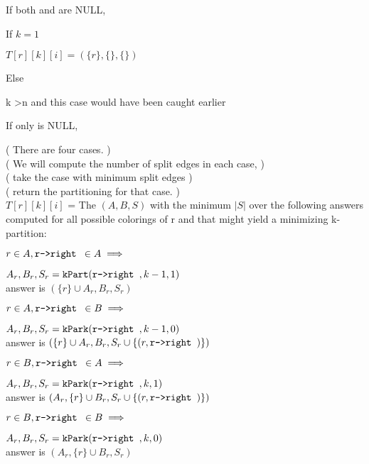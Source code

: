 \documentclass[11pt]{article}
\begin{document}
\begin{indentmore}
    If both \rleft and \rright are NULL,
        \begin{indentmore}
        If $k=1$
            \begin{indentmore}
            $T[r][k][i] = (\{r\}, \{\}, \{\})$
           \end{indentmore}
        Else
            \begin{indentmore}
            k \textgreater n and this case would have been caught earlier
           \end{indentmore}
       \end{indentmore}
    If only \rleft is NULL,
        \begin{indentmore}
        ( There are four cases. )\\
        ( We will compute the number of split edges in each case, )\\
        ( take the case with minimum split edges )\\
        ( return the partitioning for that case. )\\
        $T[r][k][i]$ = The $(A,B,S)$ with the minimum $|S|$ over the following answers computed for all possible colorings of r and \rright that might yield a minimizing k-partition:
          \begin{indentmore}
          $r \in A, \texttt{r->right } \in A \implies $
            \begin{indentmore}
            $A_r, B_r, S_r = \mathtt{kPart}(\texttt{r->right },k-1,1)$\\
            answer is $(\{r\} \cup A_r, B_r, S_r)$
            \end{indentmore}
          $r \in A, \texttt{r->right } \in B \implies $
            \begin{indentmore}
            $A_r, B_r, S_r = \mathtt{kPark}(\texttt{r->right },k-1,0)$\\
            answer is $(\{r\} \cup A_r, B_r, S_r \cup \{(r, \texttt{r->right })\})$
           \end{indentmore}
          $r \in B, \texttt{r->right } \in A \implies $
            \begin{indentmore}
            $A_r, B_r, S_r = \mathtt{kPark}(\texttt{r->right },k,1)$\\
            answer is $(A_r,\{r\} \cup B_r, S_r \cup \{(r, \texttt{r->right })\})$
           \end{indentmore}
          $r \in B, \texttt{r->right } \in B \implies $
            \begin{indentmore}
            $A_r, B_r, S_r = \mathtt{kPark}(\texttt{r->right },k,0)$\\
            answer is $(A_r,\{r\} \cup B_r, S_r)$
           \end{indentmore}
          \end{indentmore}


\end{indentmore}
\end{indentmore}
\end{document}
